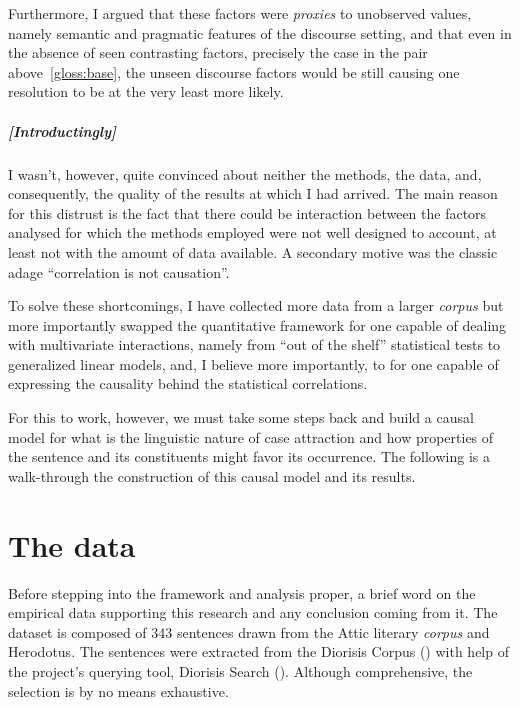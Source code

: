 \documentclass[a4paper, 12pt, article]{memoir}
\begin{document}
Furthermore, I argued that these factors were \emph{proxies} to unobserved
values, namely semantic and pragmatic features of the discourse setting, and
that even in the absence of seen contrasting factors, precisely the case in the
pair above~\ref{gloss:base}, the unseen discourse factors would be still causing
one resolution to be at the very least more likely.

\paragraph{[Introductingly]}
I wasn't, however, quite convinced about neither the methods, the data, and,
consequently, the quality of the results at which I had arrived.
The main reason for this distrust is the fact that there could be interaction
between the factors analysed for which the methods employed were not well designed
to account, at least not with the amount of data available.
A secondary motive was the classic adage ``correlation is not causation''.

To solve these shortcomings, I have collected more data from a larger
\emph{corpus} but more importantly swapped the quantitative framework for one
capable of dealing with multivariate interactions, namely from ``out of the
shelf'' statistical tests to generalized linear models, and, I believe more
importantly, to for one capable of expressing the causality behind the
statistical correlations.

For this to work, however, we must take some steps back and build a causal
model for what is the linguistic nature of case attraction and how properties of
the sentence and its constituents might favor its occurrence.
The following is a walk-through the construction of this causal model and its
results.

\chapter{The data} %

Before stepping into the framework and analysis proper, a brief word on the
empirical data supporting this research and any conclusion coming from it.
The dataset is composed of 343 sentences drawn from the Attic literary
\emph{corpus} and Herodotus.
The sentences were extracted from the Diorisis Corpus
(\cite{TheDiorisisAncientGreekCorpus,diorisis2021}) with help of the project's
querying tool, Diorisis Search (\cite{DiorisisSearch}).
Although comprehensive, the selection is by no means exhaustive.
\end{document}
